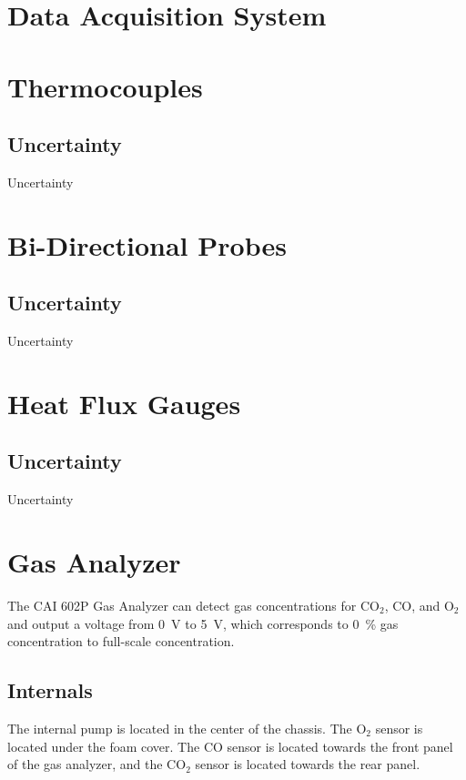 \documentclass[11pt,oneside]{book}
\begin{document}
\mainmatter


\chapter{Data Acquisition System}


\chapter{Thermocouples}

\section{Uncertainty}

Uncertainty


\chapter{Bi-Directional Probes}

\section{Uncertainty}

Uncertainty


\chapter{Heat Flux Gauges}

\section{Uncertainty}

Uncertainty


\chapter{Gas Analyzer}
\label{chap:Gas_Analyzer}

The CAI 602P Gas Analyzer can detect gas concentrations for CO$_2$, CO, and O$_2$ and output a voltage from 0~V to 5~V, which corresponds to 0~\% gas concentration to full-scale concentration.

\section{Internals}

The internal pump is located in the center of the chassis. The O$_2$ sensor is located under the foam cover. The CO sensor is located towards the front panel of the gas analyzer, and the CO$_2$ sensor is located towards the rear panel.
\end{document}
